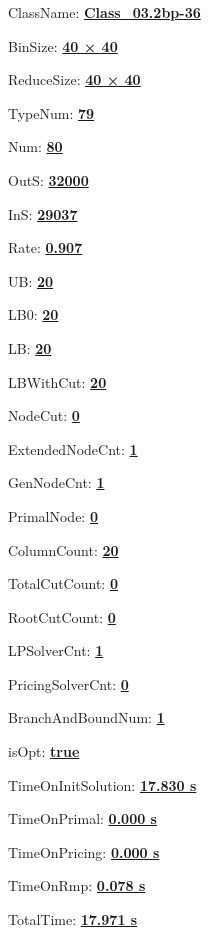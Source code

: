 \documentclass[11pt]{article}
\begin{document}
\pagestyle{empty}


ClassName: \underline{\textbf{Class_03.2bp-36}}
\par
BinSize: \underline{\textbf{40 × 40}}
\par
ReduceSize: \underline{\textbf{40 × 40}}
\par
TypeNum: \underline{\textbf{79}}
\par
Num: \underline{\textbf{80}}
\par
OutS: \underline{\textbf{32000}}
\par
InS: \underline{\textbf{29037}}
\par
Rate: \underline{\textbf{0.907}}
\par
UB: \underline{\textbf{20}}
\par
LB0: \underline{\textbf{20}}
\par
LB: \underline{\textbf{20}}
\par
LBWithCut: \underline{\textbf{20}}
\par
NodeCut: \underline{\textbf{0}}
\par
ExtendedNodeCnt: \underline{\textbf{1}}
\par
GenNodeCnt: \underline{\textbf{1}}
\par
PrimalNode: \underline{\textbf{0}}
\par
ColumnCount: \underline{\textbf{20}}
\par
TotalCutCount: \underline{\textbf{0}}
\par
RootCutCount: \underline{\textbf{0}}
\par
LPSolverCnt: \underline{\textbf{1}}
\par
PricingSolverCnt: \underline{\textbf{0}}
\par
BranchAndBoundNum: \underline{\textbf{1}}
\par
isOpt: \underline{\textbf{true}}
\par
TimeOnInitSolution: \underline{\textbf{17.830 s}}
\par
TimeOnPrimal: \underline{\textbf{0.000 s}}
\par
TimeOnPricing: \underline{\textbf{0.000 s}}
\par
TimeOnRmp: \underline{\textbf{0.078 s}}
\par
TotalTime: \underline{\textbf{17.971 s}}
\par
\newpage


\end{document}
